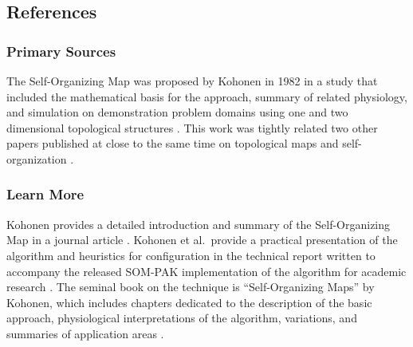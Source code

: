 \subsection{References}

% 
% 
\subsubsection{Primary Sources}
The Self-Organizing Map was proposed by Kohonen in 1982 in a study that included the mathematical basis for the approach, summary of related physiology, and simulation on demonstration problem domains using one and two dimensional topological structures \cite{Kohonen1982}.
This work was tightly related two other papers published at close to the same time on topological maps and self-organization \cite{Kohonen1981, Kohonen1982b}.

% 
% 
\subsubsection{Learn More}
Kohonen provides a detailed introduction and summary of the Self-Organizing Map in a journal article \cite{Kohonen1990a}.
Kohonen et al.\ provide a practical presentation of the algorithm and heuristics for configuration in the technical report written to accompany the released SOM-PAK implementation of the algorithm for academic research \cite{Kohonen1996a}.
The seminal book on the technique is ``Self-Organizing Maps'' by Kohonen, which includes chapters dedicated to the description of the basic approach, physiological interpretations of the algorithm, variations, and summaries of application areas \cite{Kohonen1995}.



